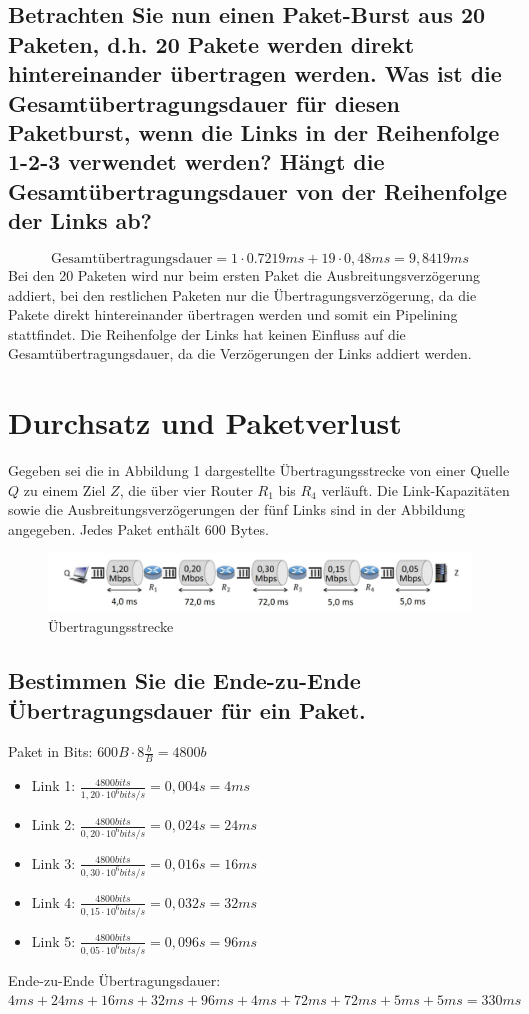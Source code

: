 \documentclass[a4paper, fleqn]{scrartcl}
\begin{document}
\subsection{Betrachten Sie nun einen Paket-Burst aus 20 Paketen, d.h. 20 Pakete werden direkt hintereinander übertragen werden. Was ist die Gesamtübertragungsdauer für diesen Paketburst, wenn die Links in der Reihenfolge 1-2-3 verwendet werden? Hängt die Gesamtübertragungsdauer von der Reihenfolge der Links ab?}
\[\text{Gesamtübertragungsdauer}=1\cdot0.7219ms+19\cdot0,48ms=9,8419ms\]
Bei den 20 Paketen wird nur beim ersten Paket die Ausbreitungsverzögerung addiert, bei den restlichen Paketen nur die Übertragungsverzögerung, da die Pakete direkt hintereinander übertragen werden und somit ein Pipelining stattfindet.
Die Reihenfolge der Links hat keinen Einfluss auf die Gesamtübertragungsdauer, da die Verzögerungen der Links addiert werden.

\section{Durchsatz und Paketverlust}
Gegeben sei die in Abbildung 1 dargestellte Übertragungsstrecke von einer Quelle $Q$ zu einem Ziel $Z$, die über vier Router $R_1$ bis $R_4$ verläuft.
Die Link-Kapazitäten sowie die Ausbreitungsverzögerungen der fünf Links sind in der Abbildung angegeben. Jedes Paket enthält 600 Bytes.
\begin{figure}[h]
\centering
\includegraphics[width=\textwidth]{übertragunsstrecke.png}
\caption{Übertragungsstrecke}
\end{figure}
\subsection{Bestimmen Sie die Ende-zu-Ende Übertragungsdauer für ein Paket.}
Paket in Bits: $600B\cdot8\frac{b}{B}=4800b$\\
\begin{itemize}
    \item Link 1: $\frac{4800bits}{1,20\cdot10^6bits/s}=0,004s=4ms$\\
    \item Link 2: $\frac{4800bits}{0,20\cdot10^6bits/s}=0,024s=24ms$\\
    \item Link 3: $\frac{4800bits}{0,30\cdot10^6bits/s}=0,016s=16ms$\\
    \item Link 4: $\frac{4800bits}{0,15\cdot10^6bits/s}=0,032s=32ms$\\
    \item Link 5: $\frac{4800bits}{0,05\cdot10^6bits/s}=0,096s=96ms$\\
\end{itemize}
Ende-zu-Ende Übertragungsdauer:\\ $4ms+24ms+16ms+32ms+96ms+4ms+72ms+72ms+5ms+5ms=330ms$
\end{document}
